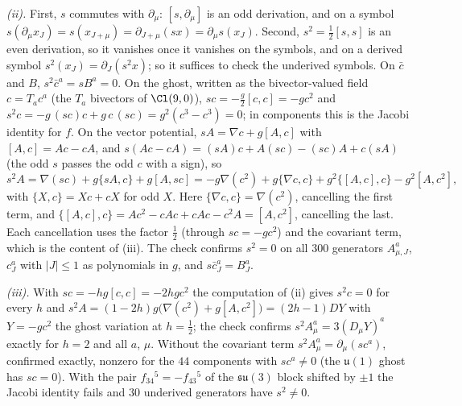 \emph{(ii).} First, $s$ commutes with $\partial_\mu$: $[s, \partial_\mu]$ is an odd derivation, and on a symbol $s(\partial_\mu x_{J}) = s(x_{J + \mu}) = \partial_{J + \mu}(sx) = \partial_\mu s(x_{J})$. Second, $s^2 = \tfrac12[s, s]$ is an even derivation, so it vanishes once it vanishes on the symbols, and on a derived symbol $s^2(x_{J}) = \partial_{J}(s^2 x)$; so it suffices to check the underived symbols. On $\bar c$ and $B$, $s^2\bar c^{a} = sB^{a} = 0$. On the ghost, written as the bivector-valued field $c = T_ac^{a}$ (the $T_a$ bivectors of $\Cl(9,0)$), $sc = -\tfrac{g}{2}[c, c] = -gc^2$ and $s^2c = -g\,(sc)c + g\,c\,(sc) = g^2(c^3 - c^3) = 0$; in components this is the Jacobi identity for $f$. On the vector potential, $sA = \nabla c + g[A, c]$ with $[A, c] = Ac - cA$, and $s(Ac - cA) = (sA)c + A(sc) - (sc)A + c(sA)$ (the odd $s$ passes the odd $c$ with a sign), so
\[
s^2A = \nabla(sc) + g\{sA, c\} + g[A, sc] = -g\nabla(c^2) + g\{\nabla c, c\} + g^2\{[A, c], c\} - g^2[A, c^2],
\]
with $\{X, c\} = Xc + cX$ for odd $X$. Here $\{\nabla c, c\} = \nabla(c^2)$, cancelling the first term, and $\{[A, c], c\} = Ac^2 - cAc + cAc - c^2A = [A, c^2]$, cancelling the last. Each cancellation uses the factor $\tfrac12$ (through $sc = -gc^2$) and the covariant term, which is the content of (iii). The check confirms $s^2 = 0$ on all $300$ generators $A^{a}_{\mu, J}$, $c^{a}_{J}$ with $|J| \le 1$ as polynomials in $g$, and $s\bar c^{a}_{J} = B^{a}_{J}$.

\emph{(iii).} With $sc = -hg[c, c] = -2hgc^2$ the computation of (ii) gives $s^2c = 0$ for every $h$ and $s^2A = (1 - 2h)g\big(\nabla(c^2) + g[A, c^2]\big) = (2h - 1)DY$ with $Y = -gc^2$ the ghost variation at $h = \tfrac12$; the check confirms $s^2A^{a}_{\mu} = 3(D_\mu Y)^{a}$ exactly for $h = 2$ and all $a$, $\mu$. Without the covariant term $s^2A^{a}_{\mu} = \partial_\mu(sc^{a})$, confirmed exactly, nonzero for the $44$ components with $sc^{a} \neq 0$ (the $\mathfrak{u}(1)$ ghost has $sc = 0$). With the pair $f_{34}{}^{5} = -f_{43}{}^{5}$ of the $\mathfrak{su}(3)$ block shifted by $\pm1$ the Jacobi identity fails and $30$ underived generators have $s^2 \neq 0$.

